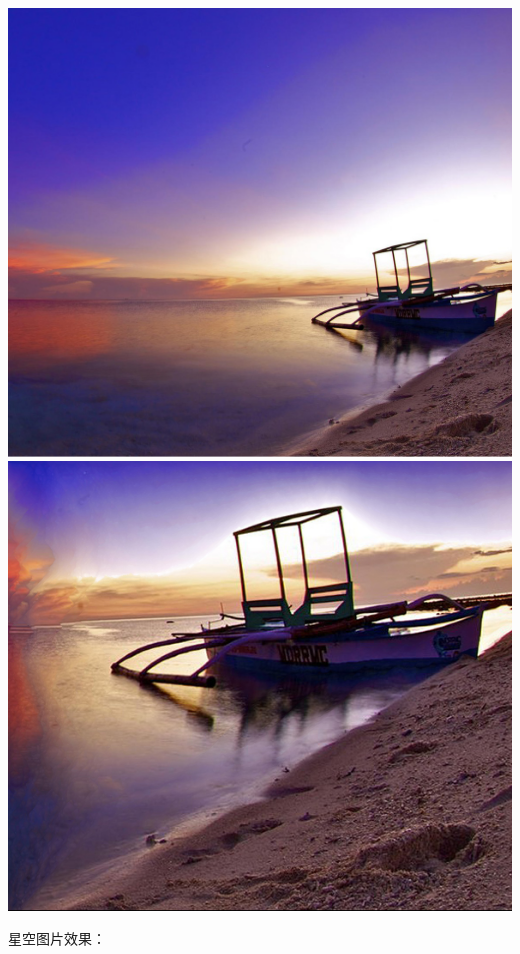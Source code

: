 \documentclass[a4paper]{article}
\begin{document}
\begin{enumerate}
  \begin{center}
    \includegraphics[scale=0.125]{Pictures/example52}
    \includegraphics[scale=0.25]{Pictures/er52nm.jpg}
  \end{center}
  星空图片效果：



\end{enumerate}
\end{document}
